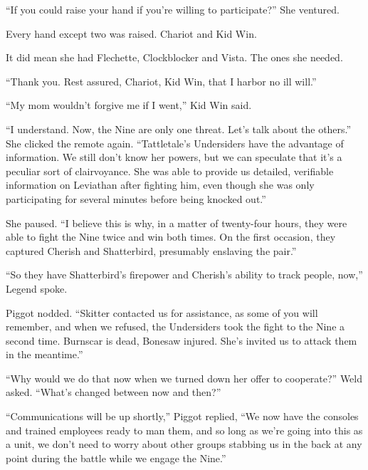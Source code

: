 ``If you could raise your hand if you're willing to participate?''  She ventured.



Every hand except two was raised.  Chariot and Kid Win.



It did mean she had Flechette, Clockblocker and Vista.  The ones she needed.



``Thank you.  Rest assured, Chariot, Kid Win, that I harbor no ill will.''



``My mom wouldn't forgive me if I went,'' Kid Win said.



``I understand.  Now, the Nine are only one threat.  Let's talk about the others.''  She clicked the remote again.  ``Tattletale's Undersiders have the advantage of information.  We still don't know her powers, but we can speculate that it's a peculiar sort of clairvoyance.  She was able to provide us detailed, verifiable information on Leviathan after fighting him, even though she was only participating for several minutes before being knocked out.''



She paused. ``I believe this is why, in a matter of twenty-four hours, they were able to fight the Nine twice and win both times.  On the first occasion, they captured Cherish and Shatterbird, presumably enslaving the pair.''



``So they have Shatterbird's firepower and Cherish's ability to track people, now,'' Legend spoke.



Piggot nodded.  ``Skitter contacted us for assistance, as some of you will remember, and when we refused, the Undersiders took the fight to the Nine a second time.  Burnscar is dead, Bonesaw injured.  She's invited us to attack them in the meantime.''



``Why would we do that now when we turned down her offer to cooperate?''  Weld asked.  ``What's changed between now and then?''



``Communications will be up shortly,'' Piggot replied, ``We now have the consoles and trained employees ready to man them, and so long as we're going into this as a unit, we don't need to worry about other groups stabbing us in the back at any point during the battle while we engage the Nine.''



